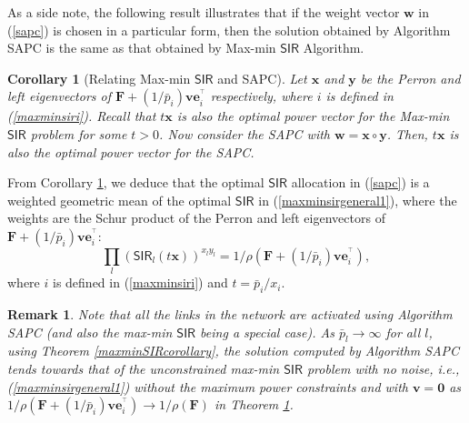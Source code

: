 \documentclass[10pt,twocolumn]{IEEEtran}
\newcommand{\0}{\mathbf{0}}
\newcommand{\1}{\mathbf{1}}
\newcommand{\trans}{^\top}
\newtheorem{corollary}{Corollary}
\newtheorem{remark}{Remark}
\begin{document}
As a side note, the following result illustrates that if the weight vector $\mathbf{w}$ in (\ref{sapc}) is chosen in a particular form, then the solution obtained by Algorithm SAPC is the same as that obtained by Max-min $\mathsf{SIR}$ Algorithm.

\begin{corollary}[Relating Max-min $\mathsf{SIR}$ and SAPC]
\label{approx1ubtheorem}
Let $\mathbf{x}$ and $\mathbf{y}$ be the Perron and left eigenvectors of $\mathbf{F}+(1/\bar{p}_i)\mathbf{v}\mathbf{e}_i^{\trans}$ respectively, where $i$ is defined in (\ref{maxminsiri}). Recall that $t\mathbf{x}$ is also the optimal power vector for the Max-min $\mathsf{SIR}$ problem for some $t>0$. Now consider the SAPC with $\mathbf{w} = \mathbf{x} \circ \mathbf{y}$. Then, $t\mathbf{x}$ is also the optimal power vector for the SAPC.
\end{corollary}

From Corollary \ref{approx1ubtheorem}, we deduce that the optimal $\mathsf{SIR}$ allocation in (\ref{sapc}) is a weighted geometric mean of the optimal $\mathsf{SIR}$ in (\ref{maxminsirgeneral1}), where the weights are the Schur product of the Perron and left eigenvectors of $\mathbf{F}+(1/\bar{p}_i)\mathbf{v}\mathbf{e}_i^{\trans}$:
\begin{equation}
\prod_l (\mathsf{SIR}_l(t \mathbf{x}))^{x_l y_l} = 1/\rho(\mathbf{F}+(1/\bar{p}_i)\mathbf{v}\mathbf{e}_i^{\trans}),
\end{equation}
where $i$ is defined in (\ref{maxminsiri}) and $t = \bar{p}_i/x_i$.

\begin{remark}
\label{unconstrainedmaxminremark}
Note that all the links in the network are activated using Algorithm SAPC (and also the max-min $\mathsf{SIR}$ being a special case). As $\bar{p}_l \rightarrow \infty$ for all $l$, using Theorem \ref{maxminSIRcorollary}, the solution computed by Algorithm SAPC tends towards that of the unconstrained max-min $\mathsf{SIR}$ problem with no noise, i.e., (\ref{maxminsirgeneral1}) without the maximum power constraints and with $\mathbf{v}=\mathbf{0}$ as $1/\rho(\mathbf{F}+(1/\bar{p}_i)\mathbf{v}\mathbf{e}_i^{\trans}) \rightarrow 1/\rho(\mathbf{F})$ in Theorem \ref{approx1ubtheorem}. 
\end{remark}
\end{document}
